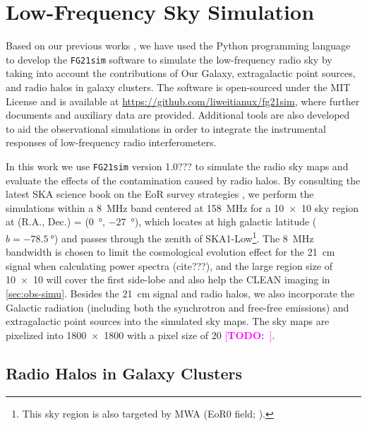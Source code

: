 \documentclass[modern]{aastex62}
\newcommand{\TODO}[1]{\textcolor{magenta}{[\textbf{TODO:}~\uuline{#1}]}}
\begin{document}
\section{Low-Frequency Sky Simulation}
\label{sec:sky-simu}

Based on our previous works \citep{wang2010,wang2013}, we have used the
Python programming language to develop the \texttt{FG21sim} software to
simulate the low-frequency radio sky by taking into account the
contributions of Our Galaxy, extragalactic point sources, and radio halos
in galaxy clusters.
The software is open-sourced under the MIT License and is available at
\url{https://github.com/liweitianux/fg21sim},
where further documents and auxiliary data are provided.
Additional tools are also developed to aid the observational simulations
in order to integrate the instrumental responses of low-frequency radio
interferometers.

In this work we use \texttt{FG21sim} version 1.0??? to simulate the
radio sky maps and evaluate the effects of the contamination caused by
radio halos.
By consulting the latest SKA science book on the EoR survey strategies
\citep[e.g.,][]{koopmans2015rev}, we perform the simulations within
a \SI{8}{\MHz} band centered at \SI{158}{\MHz} for a \SI{10 x 10}{\deg}
sky region at (R.A., Dec.) = (\SI{0}{\degree}, \SI{-27}{\degree}),
which locates at high galactic latitude ($b = \SI{-78.5}{\degree}$)
and passes through the zenith of SKA1-Low\footnote{This sky region
  is also targeted by MWA (EoR0 field; \citealt{beardsley2016}).}.
The \SI{8}{\MHz} bandwidth is chosen to limit the cosmological evolution
effect for the 21~cm signal when calculating power spectra (cite???),
and the large region size of \SI{10 x 10}{\deg} will cover the first
side-lobe and also help the CLEAN imaging in \autoref{sec:obs-simu}.
Besides the 21~cm signal and radio halos, we also incorporate the
Galactic radiation (including both the synchrotron and free-free emissions)
and extragalactic point sources into the simulated sky maps.
The sky maps are pixelized into \num{1800 x 1800} with a pixel size of
\SI{20}{\arcsec} \TODO{improve to 10 arcsec/pixel???}.


\subsection{Radio Halos in Galaxy Clusters}
\label{sec:cluster-halo}
\end{document}
